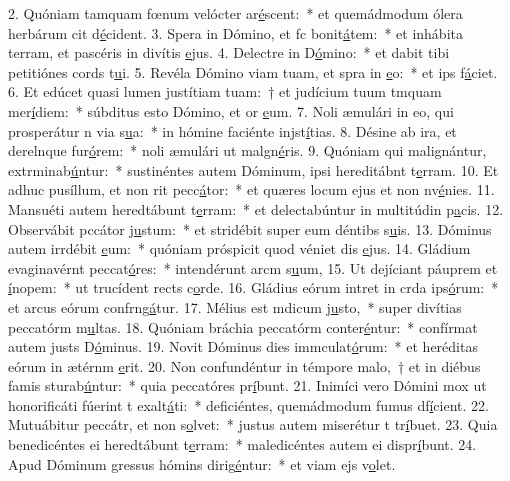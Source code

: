 2. Quóniam tamquam fœnum velócter ar\uline{é}scent:~* et quemádmodum ólera herbárum cit d\uline{é}cident.
3. Spera in Dómino, et fc bonit\uline{á}tem:~* et inhábita terram, et pascéris in divítis \uline{e}jus.
4. Delectre in D\uline{ó}mino:~* et dabit tibi petitiónes cords t\uline{u}i.
5. Revéla Dómino viam tuam, et spra in \uline{e}o:~* et ips f\uline{á}ciet.
6. Et edúcet quasi lumen justítiam tuam:~† et judícium tuum tmquam mer\uline{í}diem:~* súbditus esto Dómino, et or \uline{e}um.
7. Noli æmulári in eo, qui prosperátur n via s\uline{u}a:~* in hómine faciénte injst\uline{í}tias.
8. Désine ab ira, et derelnque fur\uline{ó}rem:~* noli æmulári ut malgn\uline{é}ris.
9. Quóniam qui malignántur, extrminab\uline{ú}ntur:~* sustinéntes autem Dóminum, ipsi hereditábnt t\uline{e}rram.
10. Et adhuc pusíllum, et non rit pecc\uline{á}tor:~* et quæres locum ejus et non nv\uline{é}nies.
11. Mansuéti autem heredtábunt t\uline{e}rram:~* et delectabúntur in multitúdin p\uline{a}cis.
12. Observábit pccátor j\uline{u}stum:~* et stridébit super eum déntibs s\uline{u}is.
13. Dóminus autem irrdébit \uline{e}um:~* quóniam próspicit quod véniet dis \uline{e}jus.
14. Gládium evaginavérnt peccat\uline{ó}res:~* intendérunt arcm s\uline{u}um,
15. Ut dejíciant páuprem et \uline{í}nopem:~* ut trucídent rects c\uline{o}rde.
16. Gládius eórum intret in crda ips\uline{ó}rum:~* et arcus eórum confrng\uline{á}tur.
17. Mélius est mdicum j\uline{u}sto,~* super divítias peccatórm m\uline{u}ltas.
18. Quóniam bráchia peccatórm conter\uline{é}ntur:~* confírmat autem justs D\uline{ó}minus.
19. Novit Dóminus dies immculat\uline{ó}rum:~* et heréditas eórum in ætérnm \uline{e}rit.
20. Non confundéntur in témpore malo,~† et in diébus famis sturab\uline{ú}ntur:~* quia peccatóres pr\uline{í}bunt.
21. Inimíci vero Dómini mox ut honorificáti fúerint t exalt\uline{á}ti:~* deficiéntes, quemádmodum fumus df\uline{í}cient.
22. Mutuábitur peccátr, et non s\uline{o}lvet:~* justus autem miserétur t tr\uline{í}buet.
23. Quia benedicéntes ei heredtábunt t\uline{e}rram:~* maledicéntes autem ei dispr\uline{í}bunt.
24. Apud Dóminum gressus hómins dirig\uline{é}ntur:~* et viam ejs v\uline{o}let.
